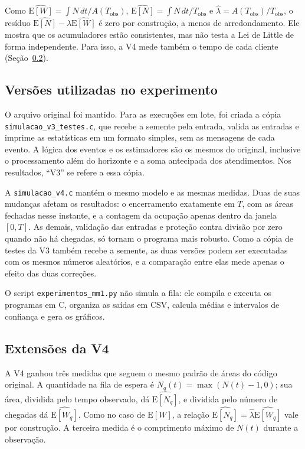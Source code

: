 \documentclass[
  article,      %
  10pt,         %
  oneside,
  a4paper,
  twocolumn,    %
  english,
  brazil        %
]{abntex2}
\newcommand{\EN}{\mathrm{E}[N]}
\newcommand{\EW}{\mathrm{E}[W]}
\newcommand{\ENq}{\mathrm{E}[N_q]}
\newcommand{\EWq}{\mathrm{E}[W_q]}
\begin{document}
Como $\widehat{\EW}=\int N\,dt/A(T_{\mathrm{obs}})$, $\widehat{\EN}=\int N\,dt/T_{\mathrm{obs}}$ e $\widehat{\lambda}=A(T_{\mathrm{obs}})/T_{\mathrm{obs}}$, o resíduo $\widehat{\EN}-\widehat{\lambda}\widehat{\EW}$ é zero por construção, a menos de arredondamento. Ele mostra que os acumuladores estão consistentes, mas não testa a Lei de Little de forma independente. Para isso, a V4 mede também o tempo de cada cliente (Seção~\ref{sec:extensoes}).

\subsection{Versões utilizadas no experimento}

O arquivo original foi mantido. Para as execuções em lote, foi criada a cópia \texttt{simulacao\_v3\_testes.c}, que recebe a semente pela entrada, valida as entradas e imprime as estatísticas em um formato simples, sem as mensagens de cada evento. A lógica dos eventos e os estimadores são os mesmos do original, inclusive o processamento além do horizonte e a soma antecipada dos atendimentos. Nos resultados, ``V3'' se refere a essa cópia.

A \texttt{simulacao\_v4.c} mantém o mesmo modelo e as mesmas medidas. Duas de suas mudanças afetam os resultados: o encerramento exatamente em $T$, com as áreas fechadas nesse instante, e a contagem da ocupação apenas dentro da janela $[0,T]$. As demais, validação das entradas e proteção contra divisão por zero quando não há chegadas, só tornam o programa mais robusto. Como a cópia de testes da V3 também recebe a semente, as duas versões podem ser executadas com os mesmos números aleatórios, e a comparação entre elas mede apenas o efeito das duas correções.

O script \texttt{experimentos\_mm1.py} não simula a fila: ele compila e executa os programas em C, organiza as saídas em CSV, calcula médias e intervalos de confiança e gera os gráficos.

\subsection{Extensões da V4}
\label{sec:extensoes}

A V4 ganhou três medidas que seguem o mesmo padrão de áreas do código original. A quantidade na fila de espera é $N_q(t)=\max(N(t)-1,0)$; sua área, dividida pelo tempo observado, dá $\widehat{\ENq}$, e dividida pelo número de chegadas dá $\widehat{\EWq}$. Como no caso de $\EW$, a relação $\widehat{\ENq}=\widehat{\lambda}\widehat{\EWq}$ vale por construção. A terceira medida é o comprimento máximo de $N(t)$ durante a observação.
\end{document}
